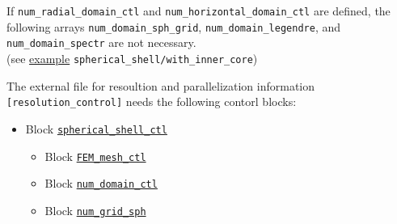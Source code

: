 If \verb|num_radial_domain_ctl| and \verb|num_horizontal_domain_ctl| are defined, the following arrays \verb|num_domain_sph_grid|, \verb|num_domain_legendre|, and \verb|num_domain_spectr| are not necessary. \\
(see \hyperref[href_t:gen_w_innercore]{example} \verb|spherical_shell/with_inner_core|)

The external file for resoultion and parallelization information \verb|[resolution_control]| needs the following contorl blocks:
%
	\begin{itemize}
	\item Block \hyperref[href_i:spherical_shell_ctl]{\tt spherical\_shell\_ctl}
		\begin{itemize}
		\item Block \hyperref[href_i:FEM_mesh_ctl]{\tt FEM\_mesh\_ctl}
		\item Block \hyperref[href_i:num_domain_ctl]{\tt num\_domain\_ctl}
		\item Block \hyperref[href_i:num_grid_sph]{\tt num\_grid\_sph}
		\end{itemize}
	\end{itemize}
%
